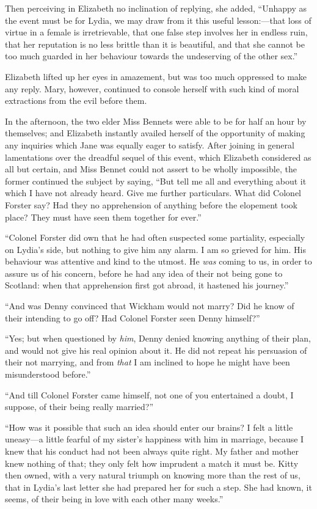 \documentclass[12pt]{book}
\begin{document}
Then perceiving in Elizabeth no inclination of replying, she added, ``Unhappy as the event must be for Lydia, we may draw from it this useful lesson:---that loss of virtue in a female is irretrievable, that one false step involves her in endless ruin, that her reputation is no less brittle than it is beautiful, and that she cannot be too much guarded in her behaviour towards the undeserving of the other sex.''

Elizabeth lifted up her eyes in amazement, but was too much oppressed to make any reply. Mary, however, continued to console herself with such kind of moral extractions from the evil before them.

In the afternoon, the two elder Miss Bennets were able to be for half an hour by themselves; and Elizabeth instantly availed herself of the opportunity of making any inquiries which Jane was equally eager to satisfy. After joining in general lamentations over the dreadful sequel of this event, which Elizabeth considered as all but certain, and Miss Bennet could not assert to be wholly impossible, the former continued the subject by saying, ``But tell me all and everything about it which I have not already heard. Give me further particulars. What did Colonel Forster say? Had they no apprehension of anything before the elopement took place? They must have seen them together for ever.''

``Colonel Forster did own that he had often suspected some partiality, especially on Lydia's side, but nothing to give him any alarm. I am so grieved for him. His behaviour was attentive and kind to the utmost. He \textit{was} coming to us, in order to assure us of his concern, before he had any idea of their not being gone to Scotland: when that apprehension first got abroad, it hastened his journey.''

``And was Denny convinced that Wickham would not marry? Did he know of their intending to go off? Had Colonel Forster seen Denny himself?''

``Yes; but when questioned by \textit{him}, Denny denied knowing anything of their plan, and would not give his real opinion about it. He did not repeat his persuasion of their not marrying, and from \textit{that} I am inclined to hope he might have been misunderstood before.''

``And till Colonel Forster came himself, not one of you entertained a doubt, I suppose, of their being really married?''

``How was it possible that such an idea should enter our brains? I felt a little uneasy---a little fearful of my sister's happiness with him in marriage, because I knew that his conduct had not been always quite right. My father and mother knew nothing of that; they only felt how imprudent a match it must be. Kitty then owned, with a very natural triumph on knowing more than the rest of us, that in Lydia's last letter she had prepared her for such a step. She had known, it seems, of their being in love with each other many weeks.''
\end{document}
